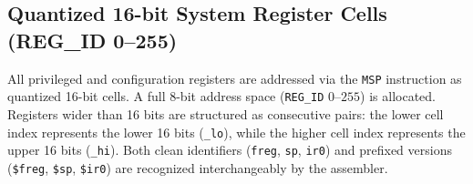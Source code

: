 \documentclass[11pt,a4paper]{article}
\begin{document}
\vspace{3mm}

\subsection{Quantized 16-bit System Register Cells (REG\_ID 0--255)}

All privileged and configuration registers are addressed via the \texttt{MSP} instruction as quantized 16-bit cells. A full 8-bit address space (\texttt{REG\_ID} \(0\)--\(255\)) is allocated. Registers wider than 16 bits are structured as consecutive pairs: the lower cell index represents the lower 16 bits (\texttt{\_lo}), while the higher cell index represents the upper 16 bits (\texttt{\_hi}). Both clean identifiers (\texttt{freg}, \texttt{sp}, \texttt{ir0}) and prefixed versions (\texttt{\$freg}, \texttt{\$sp}, \texttt{\$ir0}) are recognized interchangeably by the assembler.
\end{document}
